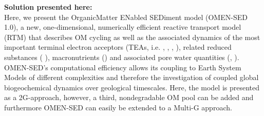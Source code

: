 \documentclass[gmd, manuscript]{copernicus}
\begin{document}


\textbf{Solution presented here:}\\
Here, we present the OrganicMatter ENabled SEDiment model (OMEN-SED 1.0), a new, one-dimensional, numerically efficient reactive transport model (RTM) 
that describes OM cycling as well as the associated dynamics of the most important terminal electron acceptors (TEAs, i.e. , , , ), 
related reduced substances ( ), macronutrients () and associated pore water quantities (, ).  
OMEN-SED's computational efficiency allows its coupling to Earth System Models of different complexities and therefore the investigation of coupled global biogeochemical dynamics over geological timescales. 
Here, the model is presented as a 2G-approach, however, a third, nondegradable OM pool can be added and furthermore OMEN-SED can easily be extended to a Multi-G approach. 
\end{document}
